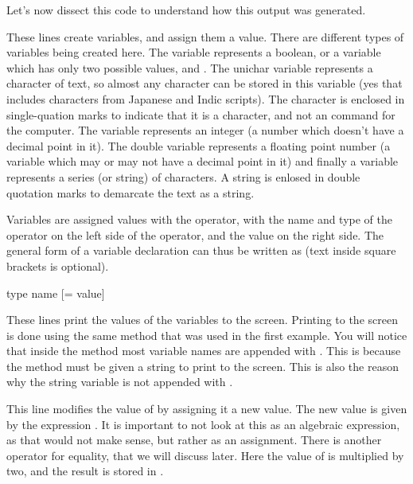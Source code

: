 Let's now dissect this code to understand how this output was generated.


These lines create variables, and assign them a value. There are different types of variables being created here. The  variable represents a boolean, or a variable which has only two possible values,  and . The unichar variable represents a character of text, so almost any character can be stored in this variable (yes that includes characters from Japanese and Indic scripts). The character is enclosed in single-quation marks to indicate that it is a character, and not an command for the computer. The  variable represents an integer (a number which doesn't have a decimal point in it). The double variable represents a floating point number (a variable which may or may not have a decimal point in it) and finally a  variable represents a series (or string) of characters. A string is enlosed in double quotation marks to demarcate the text as a string.

Variables are assigned values with the \inlinecode{=} operator, with the name and type of the operator on the left side of the operator, and the value on the right side. The general form of a variable declaration can thus be written as (text inside square brackets is optional).

\begin{bashcommands}
type name [= value]
\end{bashcommands}


These lines print the values of the variables to the screen. Printing to the screen is done using the same  method that was used in the first example. You will notice that inside the  method most variable names are appended with . This is because the  method must be given a string to print to the screen. This is also the reason why the string variable is not appended with .


This line modifies the value of  by assigning it a new value. The new value is given by the expression . It is important to not look at this as an algebraic expression, as that would not make sense, but rather as an assignment. There is another operator for equality, that we will discuss later. Here the value of  is multiplied by two, and the result is stored in .

